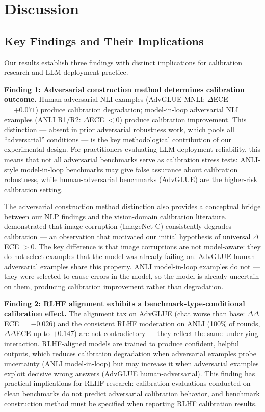 \section{Discussion}
\label{sec:discussion}

\subsection{Key Findings and Their Implications}

Our results establish three findings with distinct implications for calibration research and LLM deployment practice.

\textbf{Finding 1: Adversarial construction method determines calibration outcome.} Human-adversarial NLI examples (AdvGLUE MNLI: $\Delta$ECE $= +0.071$) produce calibration degradation; model-in-loop adversarial NLI examples (ANLI R1/R2: $\Delta$ECE $< 0$) produce calibration improvement. This distinction --- absent in prior adversarial robustness work, which pools all ``adversarial'' conditions --- is the key methodological contribution of our experimental design. For practitioners evaluating LLM deployment reliability, this means that not all adversarial benchmarks serve as calibration stress tests: ANLI-style model-in-loop benchmarks may give false assurance about calibration robustness, while human-adversarial benchmarks (AdvGLUE) are the higher-risk calibration setting.

The adversarial construction method distinction also provides a conceptual bridge between our NLP findings and the vision-domain calibration literature. \citet{minderer2021revisiting} demonstrated that image corruption (ImageNet-C) consistently degrades calibration --- an observation that motivated our initial hypothesis of universal $\Delta$ECE $> 0$. The key difference is that image corruptions are not model-aware: they do not select examples that the model was already failing on. AdvGLUE human-adversarial examples share this property. ANLI model-in-loop examples do not --- they were selected to cause errors in the model, so the model is already uncertain on them, producing calibration improvement rather than degradation.

\textbf{Finding 2: RLHF alignment exhibits a benchmark-type-conditional calibration effect.} The alignment tax on AdvGLUE (chat worse than base: $\Delta\Delta$ECE $= -0.026$) and the consistent RLHF moderation on ANLI (100\% of rounds, $\Delta\Delta$ECE up to $+0.147$) are not contradictory --- they reflect the same underlying interaction. RLHF-aligned models are trained to produce confident, helpful outputs, which reduces calibration degradation when adversarial examples probe uncertainty (ANLI model-in-loop) but may increase it when adversarial examples exploit decisive wrong answers (AdvGLUE human-adversarial). This finding has practical implications for RLHF research: calibration evaluations conducted on clean benchmarks do not predict adversarial calibration behavior, and benchmark construction method must be specified when reporting RLHF calibration results.

